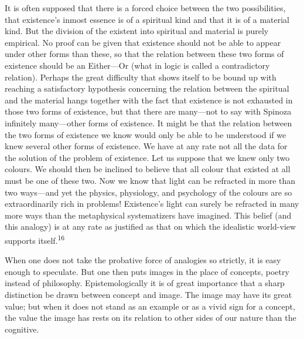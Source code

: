 \documentclass[12pt,a4paper]{book}
\begin{document}
It is often supposed that there is a forced choice between the two
possibilities, that existence's inmost essence is of a spiritual kind and that
it is of a material kind. But the division of the existent into spiritual and
material is purely empirical. No proof can be given that existence should not
be able to appear under other forms than these, so that the relation between
these two forms of existence should be an Either---Or (what in logic is called
a contradictory relation). Perhaps the great difficulty that shows itself to
be bound up with reaching a satisfactory hypothesis concerning the relation
between the spiritual and the material hangs together with the fact that
existence is not exhausted in those two forms of existence, but that there are
many---not to say with Spinoza infinitely many---other forms of existence. It
might be that the relation between the two forms of existence we know would
only be able to be understood if we knew several other forms of existence. We
have at any rate not all the data for the solution of the problem of
existence. Let us suppose that we knew only two colours. We should then be
inclined to believe that all colour that existed at all must be one of these
two. Now we know that light can be refracted in more than two ways---and yet
the physics, physiology, and psychology of the colours are so extraordinarily
rich in problems! Existence's light can surely be refracted in many more ways
than the metaphysical systematizers have imagined. This belief (and this
analogy) is at any rate as justified as that on which the idealistic world-view
supports itself.\textsuperscript{16}

When one does not take the probative force of analogies so strictly, it is
easy enough to speculate. But one then puts images in the place of concepts,
poetry instead of philosophy. Epistemologically it is of great importance that
a sharp distinction be drawn between concept and image. The image may have its
great value; but when it does not stand as an example or as a vivid sign for a
concept, the value the image has rests on its relation to other sides of our
nature than the cognitive.

\medskip
\end{document}
